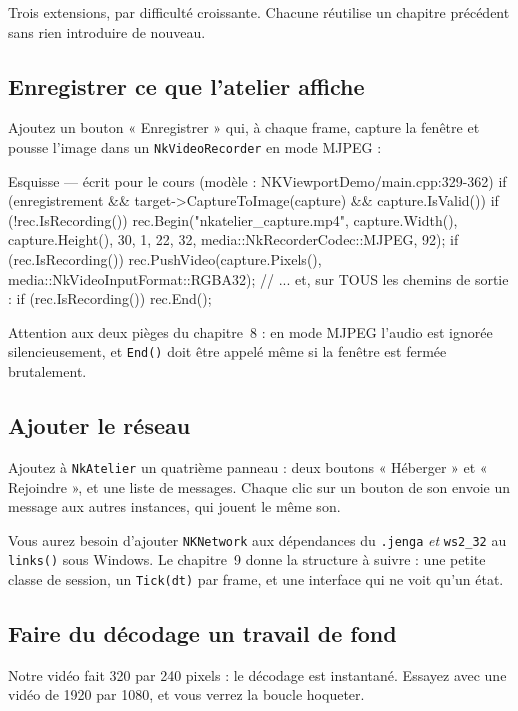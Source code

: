 Trois extensions, par difficulté croissante. Chacune réutilise un chapitre
précédent sans rien introduire de nouveau.

\subsection{Enregistrer ce que l'atelier affiche}

Ajoutez un bouton « Enregistrer » qui, à chaque frame,
capture la fenêtre et pousse l'image dans un \texttt{NkVideoRecorder} en mode
MJPEG :

\begin{nkcode}{Esquisse — écrit pour le cours (modèle : NKViewportDemo/main.cpp:329-362)}
if (enregistrement && target->CaptureToImage(capture) && capture.IsValid()) {
    if (!rec.IsRecording())
        rec.Begin("nkatelier_capture.mp4", capture.Width(), capture.Height(),
                  30, 1, 22, 32, media::NkRecorderCodec::MJPEG, 92);
    if (rec.IsRecording())
        rec.PushVideo(capture.Pixels(), media::NkVideoInputFormat::RGBA32);
}
// ... et, sur TOUS les chemins de sortie :
if (rec.IsRecording())
    rec.End();
\end{nkcode}

Attention aux deux pièges du chapitre~8 : en mode MJPEG l'audio est ignorée
silencieusement, et \texttt{End()} doit être appelé même si la fenêtre est fermée
brutalement.

\subsection{Ajouter le réseau}

Ajoutez à \texttt{NkAtelier} un quatrième panneau : deux boutons « Héberger » et
« Rejoindre », et une liste de messages. Chaque clic sur un bouton de son envoie
un message aux autres instances, qui jouent le même son.

Vous aurez besoin d'ajouter \texttt{NKNetwork} aux dépendances du
\texttt{.jenga} \emph{et} \texttt{ws2\_32} au \texttt{links()} sous Windows. Le
chapitre~9 donne la structure à suivre : une petite classe de session, un
\texttt{Tick(dt)} par frame, et une interface qui ne voit qu'un état.

\subsection{Faire du décodage un travail de fond}

Notre vidéo fait 320 par 240 pixels : le décodage est instantané. Essayez avec
une vidéo de 1920 par 1080, et vous verrez la boucle hoqueter.

